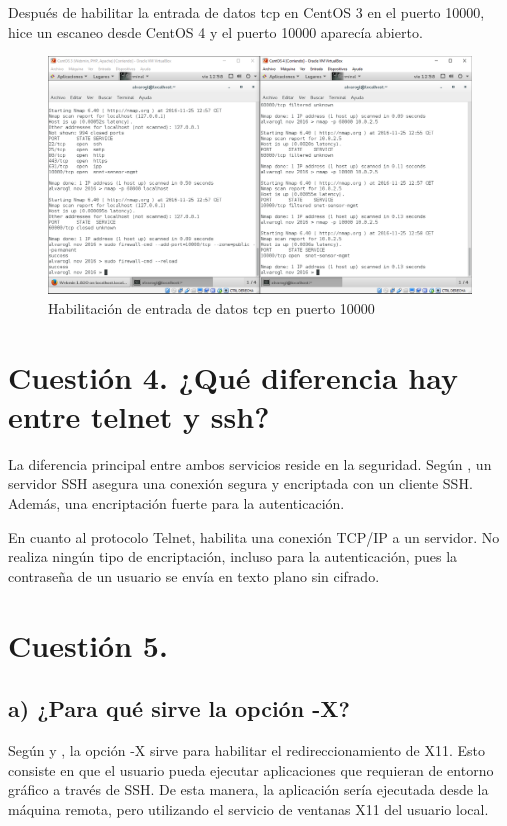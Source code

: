 Después de habilitar la entrada de datos tcp en CentOS 3 en el puerto 10000, hice un escaneo desde CentOS 4 y el puerto 10000 aparecía abierto.

\begin{figure}[H]
	\centering
	\includegraphics[scale=0.45]{ise7.png}
	\caption{Habilitación de entrada de datos tcp en puerto 10000} \label{ise7}
\end{figure}

\newpage

\section{Cuestión 4. ¿Qué diferencia hay entre telnet y ssh?}

La diferencia principal entre ambos servicios reside en la seguridad. Según \cite{telnet-ssh}, un servidor SSH asegura una conexión segura y encriptada con un cliente SSH. Además, una encriptación fuerte para la autenticación.

En cuanto al protocolo Telnet, habilita una conexión TCP/IP a un servidor. No realiza ningún tipo de encriptación, incluso para la autenticación, pues la contraseña de un usuario se envía en texto plano sin cifrado.


\section{Cuestión 5.}

\subsection{a) ¿Para qué sirve la opción -X?}

Según \cite{ssh} y \cite{x11}, la opción -X sirve para habilitar el redireccionamiento de X11. Esto consiste en que el usuario pueda ejecutar aplicaciones que requieran de entorno gráfico a través de SSH. De esta manera, la aplicación sería ejecutada desde la máquina remota, pero utilizando el servicio de ventanas X11 del usuario local.

